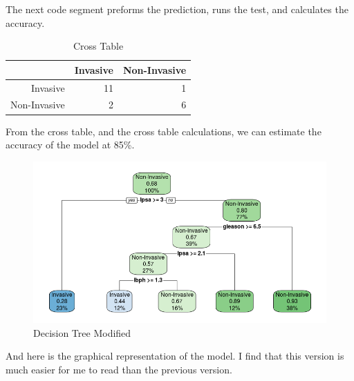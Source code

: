 \documentclass[]{article}
\newenvironment{Shaded}{\begin{snugshade}}{\end{snugshade}}
\newcommand{\KeywordTok}[1]{\textcolor[rgb]{0.13,0.29,0.53}{\textbf{#1}}}
\newcommand{\DataTypeTok}[1]{\textcolor[rgb]{0.13,0.29,0.53}{#1}}
\newcommand{\DecValTok}[1]{\textcolor[rgb]{0.00,0.00,0.81}{#1}}
\newcommand{\FloatTok}[1]{\textcolor[rgb]{0.00,0.00,0.81}{#1}}
\newcommand{\StringTok}[1]{\textcolor[rgb]{0.31,0.60,0.02}{#1}}
\newcommand{\OperatorTok}[1]{\textcolor[rgb]{0.81,0.36,0.00}{\textbf{#1}}}
\newcommand{\NormalTok}[1]{#1}
\renewcommand{\&}{and}
\begin{document}
The next code segment preforms the prediction, runs the test, and
calculates the accuracy.

\begin{Shaded}
\end{Shaded}

\begin{table}[ht]
\centering
\caption{Cross Table}
\vspace{0.2cm}
\begin{tabular}{rrr}
  \hline
 & Invasive & Non-Invasive \\ 
  \hline
Invasive &  11 &   1 \\ 
  Non-Invasive &   2 &   6 \\ 
   \hline
\end{tabular}
\end{table}

From the cross table, and the cross table calculations, we can estimate
the accuracy of the model at 85\%. \newpage

\begin{figure}[htb]
\caption{Decision Tree Modified}
\vspace{0.2cm}
\includegraphics{noninvasive.png}
\end{figure}

And here is the graphical representation of the model. I find that this
version is much easier for me to read than the previous version.
\end{document}

